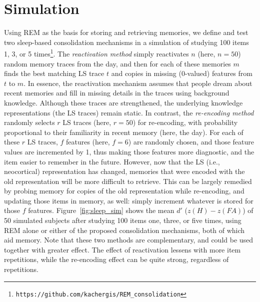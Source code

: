 \documentclass[10pt,letterpaper]{article}
\begin{document}
\section{Simulation}
\vspace{-.1cm}
Using REM as the basis for storing and retrieving memories, we define and test two sleep-based consolidation mechanisms in a simulation of studying 100 items 1, 3, or 5 times\footnote{\texttt{https://github.com/kachergis/REM\_consolidation}}. The \emph{reactivation method} simply reactivates $n$ (here, $n=50$) random memory traces from the day, and then for each of these memories $m$ finds the best matching LS trace $t$ and copies in missing (0-valued) features from $t$ to $m$. In essence, the reactivation mechanism assumes that people dream about recent memories and fill in missing details in the traces using background knowledge. Although these traces are strengthened, the underlying knowledge representations (the LS traces) remain static. In contrast, the \emph{re-encoding method} randomly selects $r$ LS traces (here, $r=50$) for re-encoding, with probability proportional to their familiarity in recent memory (here, the day). For each of these $r$ LS traces, $f$ features (here, $f=6$) are randomly chosen, and those feature values are incremented by 1, thus making those features more diagnostic, and the item easier to remember in the future. However, now that the LS (i.e., neocortical) representation has changed, memories that were encoded with the old representation will be more difficult to retrieve. This can be largely remedied by probing memory for copies of the old representation while re-encoding, and updating those items in memory, as well: simply increment whatever is stored for those $f$ features. Figure~\ref{fig:sleep_sim} shows the mean $d'$ ($z(H) - z(FA)$) of 50 simulated subjects after studying 100 items one, three, or five times, using REM alone or either of the proposed consolidation mechanisms, both of which aid memory. Note that these two methods are complementary, and could be used together with greater effect. The effect of reactivation lessens with more item repetitions, while the re-encoding effect can be quite strong, regardless of repetitions.
\end{document}
